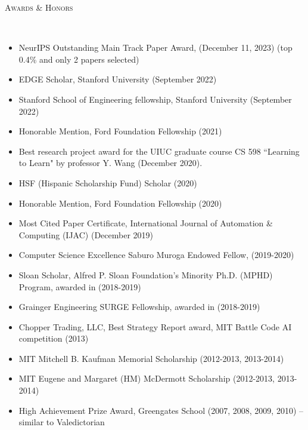 \documentclass{article}
\newenvironment{changemargin}[2]{%
  \begin{list}{}{%
    \setlength{\topsep}{0pt}%
    \setlength{\leftmargin}{#1}%
    \setlength{\rightmargin}{#2}%
    \setlength{\listparindent}{\parindent}%
    \setlength{\itemindent}{\parindent}%
    \setlength{\parsep}{\parskip}%
  }%
  \item[]}{\end{list}
}
\newcommand{\lineover}{
	\begin{changemargin}{-0.05in}{-0.05in}
		\vspace*{-8pt}
		\hrulefill \\
		\vspace*{-2pt}
	\end{changemargin}
}
\newcommand{\header}[1]{
	\begin{changemargin}{-0.5in}{-0.5in}
		\scshape{#1}\\
  	\lineover
	\end{changemargin}
}
\newenvironment{body} {
	\vspace*{-16pt}
	\begin{changemargin}{-0.25in}{-0.5in}
  }	
	{\end{changemargin}
}
\begin{document}
\header{Awards \& Honors}
\begin{body}
\vspace{16pt}
\begin{itemize} \itemsep -2pt
    \item NeurIPS Outstanding Main Track Paper Award, (December 11, 2023) (top 0.4\% and only 2 papers selected)
    \item EDGE Scholar, Stanford University (September 2022)
    \item Stanford School of Engineering fellowship, Stanford University (September 2022)
    \item Honorable Mention, Ford Foundation Fellowship (2021)
    \item Best research project award for the UIUC graduate course CS 598 ``Learning to Learn" by professor Y. Wang (December 2020).
    \item HSF (Hispanic Scholarship Fund) Scholar (2020)
    \item Honorable Mention, Ford Foundation Fellowship (2020)
    \item Most Cited Paper Certificate, International Journal of Automation \& Computing (IJAC) (December 2019)
    \item Computer Science Excellence Saburo Muroga Endowed Fellow, (2019-2020)
	\item Sloan Scholar, Alfred P. Sloan Foundation’s Minority Ph.D. (MPHD) Program, awarded in (2018-2019)
	\item Grainger Engineering SURGE Fellowship, awarded in (2018-2019)
	\item Chopper Trading, LLC, Best Strategy Report award, MIT Battle Code AI competition (2013)
	\item MIT Mitchell B. Kaufman Memorial Scholarship (2012-2013, 2013-2014)
	\item MIT Eugene and Margaret (HM) McDermott Scholarship (2012-2013, 2013-2014)
	\item High Achievement Prize Award, Greengates School (2007, 2008, 2009, 2010) -- similar to Valedictorian
\end{itemize}
\end{body}
\end{document}
